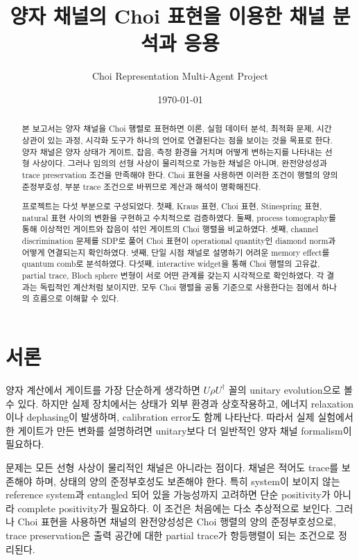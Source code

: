 \documentclass[11pt,a4paper]{article}
\title{\textbf{양자 채널의 Choi 표현을 이용한 채널 분석과 응용}}
\author{Choi Representation Multi-Agent Project}
\date{\today}
\begin{document}
\maketitle

\begin{abstract}
본 보고서는 양자 채널을 Choi 행렬로 표현하면 이론, 실험 데이터 분석, 최적화 문제, 시간 상관이 있는 과정, 시각화 도구가 하나의 언어로 연결된다는 점을 보이는 것을 목표로 한다. 양자 채널은 양자 상태가 게이트, 잡음, 측정 환경을 거치며 어떻게 변하는지를 나타내는 선형 사상이다. 그러나 임의의 선형 사상이 물리적으로 가능한 채널은 아니며, 완전양성성과 trace preservation 조건을 만족해야 한다. Choi 표현을 사용하면 이러한 조건이 행렬의 양의 준정부호성, 부분 trace 조건으로 바뀌므로 계산과 해석이 명확해진다.

프로젝트는 다섯 부분으로 구성되었다. 첫째, Kraus 표현, Choi 표현, Stinespring 표현, natural 표현 사이의 변환을 구현하고 수치적으로 검증하였다. 둘째, process tomography를 통해 이상적인 게이트와 잡음이 섞인 게이트의 Choi 행렬을 비교하였다. 셋째, channel discrimination 문제를 SDP로 풀어 Choi 표현이 operational quantity인 diamond norm과 어떻게 연결되는지 확인하였다. 넷째, 단일 시점 채널로 설명하기 어려운 memory effect를 quantum comb로 분석하였다. 다섯째, interactive widget을 통해 Choi 행렬의 고유값, partial trace, Bloch sphere 변형이 서로 어떤 관계를 갖는지 시각적으로 확인하였다. 각 결과는 독립적인 계산처럼 보이지만, 모두 Choi 행렬을 공통 기준으로 사용한다는 점에서 하나의 흐름으로 이해할 수 있다.
\end{abstract}

\tableofcontents
\newpage

\section{서론}

양자 계산에서 게이트를 가장 단순하게 생각하면 $U\rho U^\dagger$ 꼴의 unitary evolution으로 볼 수 있다. 하지만 실제 장치에서는 상태가 외부 환경과 상호작용하고, 에너지 relaxation이나 dephasing이 발생하며, calibration error도 함께 나타난다. 따라서 실제 실험에서 한 게이트가 만든 변화를 설명하려면 unitary보다 더 일반적인 양자 채널 formalism이 필요하다.

문제는 모든 선형 사상이 물리적인 채널은 아니라는 점이다. 채널은 적어도 trace를 보존해야 하며, 상태의 양의 준정부호성도 보존해야 한다. 특히 system이 보이지 않는 reference system과 entangled 되어 있을 가능성까지 고려하면 단순 positivity가 아니라 complete positivity가 필요하다. 이 조건은 처음에는 다소 추상적으로 보인다. 그러나 Choi 표현을 사용하면 채널의 완전양성성은 Choi 행렬의 양의 준정부호성으로, trace preservation은 출력 공간에 대한 partial trace가 항등행렬이 되는 조건으로 정리된다.
\end{document}
